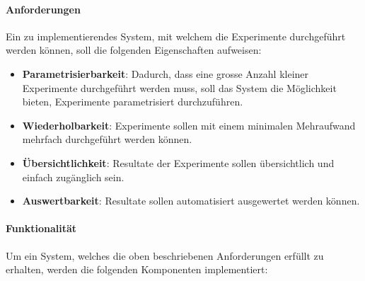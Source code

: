 \paragraph{Anforderungen}
\label{technical_setup:requirements}
Ein zu implementierendes System, mit welchem die Experimente durchgeführt werden können, soll die folgenden Eigenschaften aufweisen:

\begin{itemize}
	\item \textbf{Parametrisierbarkeit}: Dadurch, dass eine grosse Anzahl kleiner Experimente durchgeführt werden muss, soll das System die Möglichkeit bieten, Experimente parametrisiert durchzuführen.
	\item \textbf{Wiederholbarkeit}: Experimente sollen mit einem minimalen Mehraufwand mehrfach durchgeführt werden können.
	\item \textbf{Übersichtlichkeit}: Resultate der Experimente sollen übersichtlich und einfach zugänglich sein.
	\item \textbf{Auswertbarkeit}: Resultate sollen automatisiert ausgewertet werden können.
\end{itemize}

\paragraph{Funktionalität}
\label{technical_setup:functionality}
Um ein System, welches die oben beschriebenen Anforderungen erfüllt zu erhalten, werden die folgenden Komponenten implementiert:

